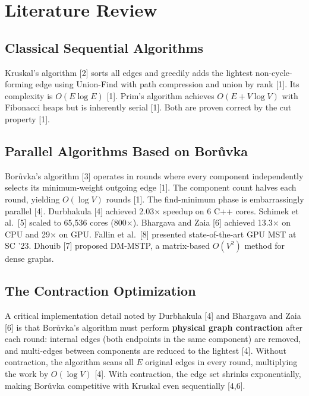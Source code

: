 \documentclass[12pt, a4paper]{article}
\begin{document}
\section{Literature Review}

\subsection{Classical Sequential Algorithms}

Kruskal's algorithm [2] sorts all edges and greedily adds the lightest non-cycle-forming edge using Union-Find with path compression and union by rank [1]. Its complexity is $O(E \log E)$ [1]. Prim's algorithm achieves $O(E + V \log V)$ with Fibonacci heaps but is inherently serial [1]. Both are proven correct by the cut property [1].

\subsection{Parallel Algorithms Based on Bor\r{u}vka}

Bor\r{u}vka's algorithm [3] operates in rounds where every component independently selects its minimum-weight outgoing edge [1]. The component count halves each round, yielding $O(\log V)$ rounds [1]. The find-minimum phase is embarrassingly parallel [4]. Durbhakula [4] achieved 2.03$\times$ speedup on 6 C++ cores. Schimek et al.\ [5] scaled to 65,536 cores (800$\times$). Bhargava and Zaia [6] achieved 13.3$\times$ on CPU and 29$\times$ on GPU. Fallin et al.\ [8] presented state-of-the-art GPU MST at SC '23. Dhouib [7] proposed DM-MSTP, a matrix-based $O(V^2)$ method for dense graphs.

\subsection{The Contraction Optimization}

A critical implementation detail noted by Durbhakula [4] and Bhargava and Zaia [6] is that Bor\r{u}vka's algorithm must perform \textbf{physical graph contraction} after each round: internal edges (both endpoints in the same component) are removed, and multi-edges between components are reduced to the lightest [4]. Without contraction, the algorithm scans all $E$ original edges in every round, multiplying the work by $O(\log V)$ [4]. With contraction, the edge set shrinks exponentially, making Bor\r{u}vka competitive with Kruskal even sequentially [4,6].
\end{document}
